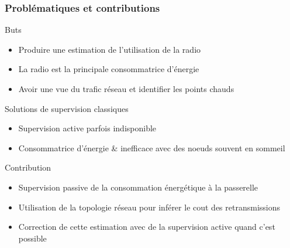 \begin{frame}\frametitle{Problématiques et contributions}

  \begin{block}{Buts}
    \begin{itemize}
      \item Produire une estimation de l'utilisation de la radio
      \item La radio est la principale consommatrice d'énergie
      \item Avoir une vue du trafic réseau et identifier les points chauds
    \end{itemize}
  \end{block}

  \begin{block}{Solutions de supervision classiques}
    \begin{itemize}
      \item Supervision active parfois indisponible
      \item Consommatrice d'énergie \& inefficace avec des noeuds souvent en sommeil
    \end{itemize}
  \end{block}

  \begin{alertblock}{Contribution}
    \begin{itemize}
      \item Supervision passive de la consommation énergétique à la passerelle
      \item Utilisation de la topologie réseau pour inférer le cout des retransmissions
      \item Correction de cette estimation avec de la supervision active quand c'est possible
    \end{itemize}
  \end{alertblock}

\end{frame}

